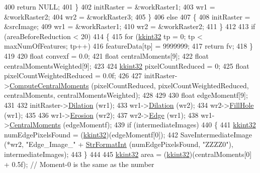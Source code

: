 \begin{DoxyCode}
400       \textcolor{keywordflow}{return} NULL;
401     \}
402     initRaster = &workRaster1;
403     wr1        = &workRaster2;
404     wr2        = &workRaster3;
405   \}
406   \textcolor{keywordflow}{else}
407   \{
408     initRaster = &srcImage;
409     wr1        = &workRaster1;
410     wr2        = &workRaster2;
411   \}
412 
413   \textcolor{keywordflow}{if}  (areaBeforeReduction < 20)
414   \{
415     \textcolor{keywordflow}{for}  (\hyperlink{namespace_k_k_b_a8fa4952cc84fda1de4bec1fbdd8d5b1b}{kkint32} tp = 0;  tp < maxNumOfFeatures;  tp++)
416       featureData[tp] = 9999999;
417     \textcolor{keywordflow}{return} fv;
418   \}
419   
420   \textcolor{keywordtype}{float}  convexf = 0.0;
421   \textcolor{keywordtype}{float}  centralMoments[9];
422   \textcolor{keywordtype}{float}  centralMomentsWeighted[9];
423 
424   \hyperlink{namespace_k_k_b_a8fa4952cc84fda1de4bec1fbdd8d5b1b}{kkint32}  pixelCountReduced = 0;
425   \textcolor{keywordtype}{float}    pixelCountWeightedReduced = 0.0f;
426 
427   initRaster->\hyperlink{class_k_k_b_1_1_raster_aba990cd9fd39b7804863b6d4cad39f05}{ComputeCentralMoments} (pixelCountReduced, pixelCountWeightedReduced, 
      centralMoments, centralMomentsWeighted);
428 
429 
430   \textcolor{keywordtype}{float}  edgeMomentf[9];
431 
432   initRaster->\hyperlink{class_k_k_b_1_1_raster_afb263b7cc4ab60bf6745c5166173bbb9}{Dilation} (wr1);
433   wr1->\hyperlink{class_k_k_b_1_1_raster_afb263b7cc4ab60bf6745c5166173bbb9}{Dilation} (wr2);
434   wr2->\hyperlink{class_k_k_b_1_1_raster_a617d427bb2b7094a9d012e63036a66d8}{FillHole} (wr1);
435 
436   wr1->\hyperlink{class_k_k_b_1_1_raster_a5a019718e60c06c4262e8127232ff19c}{Erosion} (wr2);
437   wr2->\hyperlink{class_k_k_b_1_1_raster_a02fe968acb47d8f7654c115041598c8a}{Edge} (wr1);
438   wr1->\hyperlink{class_k_k_b_1_1_raster_a48d9a6e24ed721effc322d9b3bb7ab7d}{CentralMoments} (edgeMomentf);
439   \textcolor{keywordflow}{if}  (intermediateImages)
440   \{
441     \hyperlink{namespace_k_k_b_a8fa4952cc84fda1de4bec1fbdd8d5b1b}{kkint32}  numEdgePixelsFound = (\hyperlink{namespace_k_k_b_a8fa4952cc84fda1de4bec1fbdd8d5b1b}{kkint32})(edgeMomentf[0]);
442     SaveIntermediateImage (*wr2, \textcolor{stringliteral}{"Edge\_Image\_"} + \hyperlink{namespace_k_k_b_ae3bde258fa036604fac8bdb0277ab46e}{StrFormatInt} (numEdgePixelsFound, \textcolor{stringliteral}{"ZZZZ0"}), 
      intermediateImages);
443   \}
444 
445   \hyperlink{namespace_k_k_b_a8fa4952cc84fda1de4bec1fbdd8d5b1b}{kkint32} area = (\hyperlink{namespace_k_k_b_a8fa4952cc84fda1de4bec1fbdd8d5b1b}{kkint32})(centralMoments[0] + 0.5f);  \textcolor{comment}{// Moment-0 is the same as the number
}
\end{DoxyCode}
